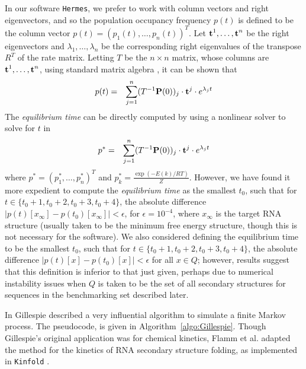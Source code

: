In our software {\tt Hermes}, we prefer to work with column vectors and
right eigenvectors, and so the population occupancy frequency
$p(t)$ is defined to be the column vector
$p(t)=(p_1(t),\ldots,p_n(t))^T$. Let
$\mbox{\bf t}^1,\ldots,\mbox{\bf t}^n$ be the right eigenvectors and
$\lambda_1,\ldots,\lambda_n$ be the corresponding right eigenvalues of the
transpose $R^T$ of the rate matrix.
Letting $T$ be the $n\times n$ matrix, whose columns are
$\mbox{\bf t}^1,\ldots,\mbox{\bf t}^n$, using standard matrix algebra
\cite{matrixTheory}, it can be shown that
\begin{eqnarray}
\label{eqn:solutionMasterEquation}
p(t) &=& \sum_{j=1}^n (T^{-1}
\mbox{\bf P}(0))_j \cdot \mbox{\bf t}^j \cdot e^{\lambda_j t}
\end{eqnarray}
The {\em equilibrium time} can be directly computed by using a
nonlinear solver to solve for $t$ in
\begin{eqnarray}
\label{eqn:solutionEquilibriumTime}
p^* &=& \sum_{j=1}^n (T^{-1}
\mbox{\bf P}(0))_j \cdot \mbox{\bf t}^j \cdot e^{\lambda_j t}
\end{eqnarray}
where $p^*= (p^*_1,\ldots,p^*_n)^T$ and $p^*_k = \frac{\exp(-E(k)/RT)}{Z}$.
However, we have found it more
expedient to compute the {\em equilibrium time} as the smallest $t_0$,
such that for $t \in \{t_0+1,t_0+2,t_0+3,t_0+4\}$, the absolute difference
$|p(t)[x_{\infty}] - p(t_0)[x_{\infty}]| < \epsilon$, for $\epsilon =
10^{-4}$, where $x_{\infty}$ is the target RNA structure (usually taken
to be the minimum free energy structure, though this is not necessary for
the software). We also considered defining the equilibrium time to be the
smallest $t_0$, such that for $t \in \{t_0+1,t_0+2,t_0+3,t_0+4\}$, the
absolute difference $|p(t)[x] - p(t_0)[x]| < \epsilon$ for all $x \in
Q$; however, results suggest that this definition is inferior
to that just given, perhaps due to numerical instability issues when
$Q$ is taken to be the set of all secondary structures for sequences in
the benchmarking set described later.


In \cite{gillespieStochasticSimulation1} Gillespie described
a very influential algorithm to simulate a finite Markov process.
The pseudocode, is given in Algorithm~\ref{algo:Gillespie}.
Though Gillespie's original application was for chemical kinetics,
Flamm et al.  adapted the method for the kinetics of RNA secondary structure
folding, as implemented in {\tt Kinfold} \cite{flammPhD,flamm}.



